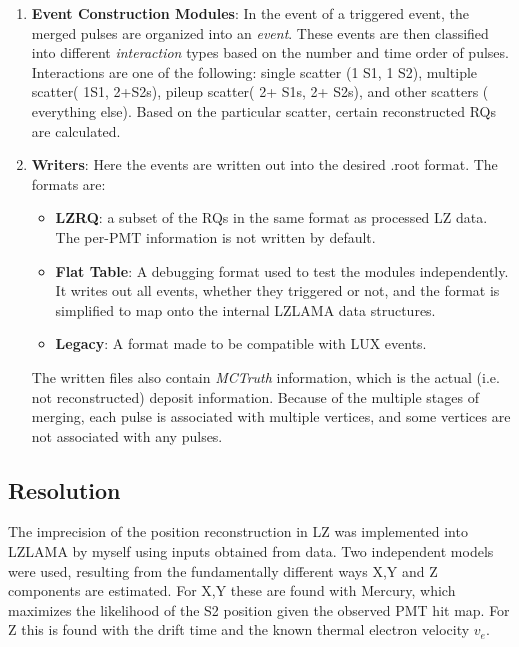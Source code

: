 \begin{enumerate}
    Merged S2s then have their positions perturbed using the \textit{PositionResolution} Module.
    This simulates the effect of the position reconstruction algorithm (Mercury) and the transverse diffusion.
    This feature was implemented by myself and detailed further in Section \ref{sec:resolution}.
    
    The area and PMT coincidences of the merged pulses are then used to determine if they trigger the pulse finder and DAQ.
    S1s in LZ are identified based on a 3-fold coincident (though this is a configurable parameter).
    S2s have a minimum area of 20 phd necessary to trigger an event.
    \item \textbf{Event Construction Modules}: In the event of a triggered event, the merged pulses are organized into an \textit{event}.
    These events are then classified into different \textit{interaction} types based on the number and time order of pulses.
    Interactions are one of the following: single scatter (1 S1, 1 S2), multiple scatter( 1S1, 2+S2s), pileup scatter( 2+ S1s, 2+ S2s), and other scatters ( everything else).
    Based on the particular scatter, certain  reconstructed RQs are calculated.
    \item \textbf{Writers}: Here the events are written out into the desired .root format.
    The formats are:
    \begin{itemize}
        \item \textbf{LZRQ}: a subset of the RQs in the same format as processed LZ data. The per-PMT information is not written by default.
        \item \textbf{Flat Table}: A debugging format used to test the modules independently. 
        It writes out all events, whether they triggered or not, and the format is simplified to map onto the internal LZLAMA data structures.
        \item \textbf{Legacy}: A format made to be compatible with LUX events.
    \end{itemize} 
    The written files also contain \textit{MCTruth} information, which is the actual (i.e. not reconstructed) deposit information.
    Because of the multiple stages of merging, each pulse is associated with multiple vertices, and some vertices are not associated with any pulses.
\end{enumerate}
\subsection{Resolution}
\label{sec:resolution}
The imprecision of the position reconstruction in LZ was implemented into LZLAMA by myself using inputs obtained from data.
Two independent models were used, resulting from the fundamentally different ways X,Y and Z components are estimated.
For X,Y these are found with Mercury, which maximizes the likelihood of the S2 position given the observed PMT hit map.
For Z this is found with the drift time and the known thermal electron velocity $v_e$.
